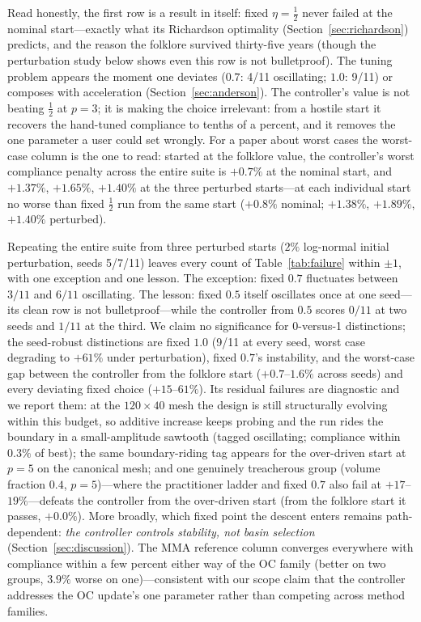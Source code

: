 \documentclass[11pt,a4paper]{article}
\begin{document}
Read honestly, the first row is a result in itself: fixed
$\eta=\tfrac12$ never failed at the nominal start---exactly what its
Richardson optimality (Section~\ref{sec:richardson}) predicts, and the
reason the folklore survived thirty-five years (though the perturbation
study below shows even this row is not bulletproof). The tuning problem appears the
moment one deviates ($0.7$: 4/11 oscillating; $1.0$: 9/11) or composes
with acceleration (Section~\ref{sec:anderson}). The controller's value
is not beating $\tfrac12$ at $p=3$; it is making the choice
irrelevant: from a hostile start it recovers the hand-tuned compliance
to tenths of a percent, and it removes the one parameter a user could
set wrongly. For a paper about worst cases the worst-case column is the
one to read: started at the folklore value, the controller's worst
compliance penalty across the entire suite is $+0.7\%$ at the nominal
start, and $+1.37\%$, $+1.65\%$, $+1.40\%$ at the three perturbed
starts---at each individual start no worse than fixed $\tfrac12$ run
from the same start ($+0.8\%$ nominal; $+1.38\%$, $+1.89\%$,
$+1.40\%$ perturbed).

Repeating the entire suite from three perturbed starts ($2\%$
log-normal initial perturbation, seeds 5/7/11) leaves every count of
Table~\ref{tab:failure} within $\pm1$, with one exception and one
lesson. The exception: fixed $0.7$ fluctuates between $3/11$ and
$6/11$ oscillating. The lesson: fixed $0.5$ itself oscillates once at
one seed---its clean row is not bulletproof---while the controller from
$0.5$ scores $0/11$ at two seeds and $1/11$ at the third. We claim no
significance for 0-versus-1 distinctions; the seed-robust distinctions
are fixed $1.0$ (9/11 at every seed, worst case degrading to $+61\%$
under perturbation), fixed $0.7$'s instability, and the worst-case gap
between the controller from the folklore start ($+0.7$--$1.6\%$ across
seeds) and every deviating fixed choice ($+15$--$61\%$). Its residual failures are diagnostic and we report them: at the
$120\times40$ mesh the design is still structurally evolving within
this budget, so additive increase keeps probing and the run rides the
boundary in a small-amplitude sawtooth (tagged oscillating; compliance
within $0.3\%$ of best); the same boundary-riding tag appears for the
over-driven start at $p=5$ on the canonical mesh; and one genuinely
treacherous group (volume fraction $0.4$, $p=5$)---where the
practitioner ladder and fixed $0.7$ also fail at
$+17$--$19\%$---defeats the controller from the over-driven start
(from the folklore start it passes, $+0.0\%$). More broadly, which
fixed point the descent enters remains path-dependent: \emph{the
controller controls stability, not basin selection}
(Section~\ref{sec:discussion}). The MMA reference column converges
everywhere with compliance within a few percent either way of the
OC family (better on two groups, $3.9\%$ worse on one)---consistent
with our scope claim that the controller addresses the OC update's one
parameter rather than competing across method families.
\end{document}
